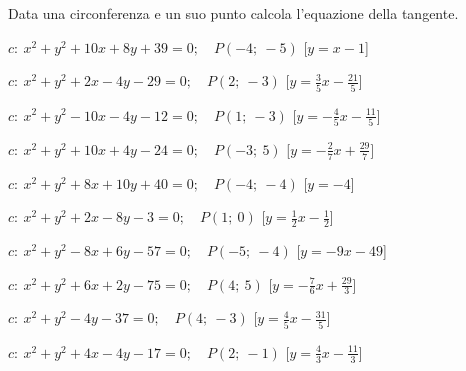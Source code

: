 \begin{esercizio}\label{ese:}
 Data una circonferenza e un suo punto calcola l'equazione della tangente.
 \begin{enumeratea}
  \item  \(c:~x^2 + y^2 +10x +8y +39 = 0; \quad P \left (-4;~-5 \right )\)
   \hfill [\(y = x -1\)]
  \item  \(c:~x^2 + y^2 +2x -4y -29 = 0; \quad P \left (2;~-3 \right )\)
   \hfill [\(y = \frac{3}{5} x -\frac{21}{5}\)]
  \item  \(c:~x^2 + y^2 -10x -4y -12 = 0; \quad P \left (1;~-3 \right )\)
   \hfill [\(y = -\frac{4}{5} x -\frac{11}{5}\)]
  \item  \(c:~x^2 + y^2 +10x +4y -24 = 0; \quad P \left (-3;~5 \right )\)
   \hfill [\(y = -\frac{2}{7} x +\frac{29}{7}\)]
  \item  \(c:~x^2 + y^2 +8x +10y +40 = 0; \quad P \left (-4;~-4 \right )\)
   \hfill [\(y = -4\)]
  \item  \(c:~x^2 + y^2 +2x -8y -3 = 0; \quad P \left (1;~0 \right )\)
   \hfill [\(y = \frac{1}{2} x -\frac{1}{2}\)]
  \item  \(c:~x^2 + y^2 -8x +6y -57 = 0; \quad P \left (-5;~-4 \right )\)
   \hfill [\(y = -9 x -49\)]
  \item  \(c:~x^2 + y^2 +6x +2y -75 = 0; \quad P \left (4;~5 \right )\)
   \hfill [\(y = -\frac{7}{6} x +\frac{29}{3}\)]
  \item  \(c:~x^2 + y^2 -4y -37 = 0; \quad P \left (4;~-3 \right )\)
   \hfill [\(y = \frac{4}{5} x -\frac{31}{5}\)]
  \item  \(c:~x^2 + y^2 +4x -4y -17 = 0; \quad P \left (2;~-1 \right )\)
   \hfill [\(y = \frac{4}{3} x -\frac{11}{3}\)]
 \end{enumeratea}
\end{esercizio}


